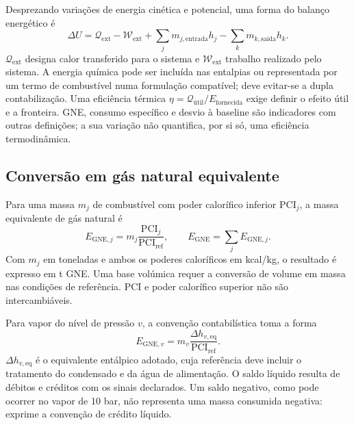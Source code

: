 Desprezando variações de energia cinética e potencial, uma forma do balanço energético é
\begin{equation}
\Delta U=\mathcal Q_{\mathrm{ext}}-\mathcal W_{\mathrm{ext}}
+\sum_j m_{j,\mathrm{entrada}}h_j-\sum_k m_{k,\mathrm{saída}}h_k.
\label{eq:mat-balanco-energia}
\end{equation}
$\mathcal Q_{\mathrm{ext}}$ designa calor transferido para o sistema e $\mathcal W_{\mathrm{ext}}$ trabalho realizado pelo sistema. A energia química pode ser incluída nas entalpias ou representada por um termo de combustível numa formulação compatível; deve evitar-se a dupla contabilização. Uma eficiência térmica $\eta=\mathcal Q_{\mathrm{útil}}/E_{\mathrm{fornecida}}$ exige definir o efeito útil e a fronteira. GNE, consumo específico e desvio à baseline são indicadores com outras definições; a sua variação não quantifica, por si só, uma eficiência termodinâmica.


\subsection{Conversão em gás natural equivalente}
\label{sec:mat-gne}
Para uma massa $m_j$ de combustível com poder calorífico inferior $\mathrm{PCI}_j$, a massa equivalente de gás natural é
\begin{equation}
E_{\mathrm{GNE},j}=m_j\frac{\mathrm{PCI}_j}{\mathrm{PCI}_{\mathrm{ref}}},
\qquad E_{\mathrm{GNE}}=\sum_j E_{\mathrm{GNE},j}.
\label{eq:mat-gne-combustivel}
\end{equation}
Com $m_j$ em toneladas e ambos os poderes caloríficos em kcal/kg, o resultado é expresso em t GNE. Uma base volúmica requer a conversão de volume em massa nas condições de referência. PCI e poder calorífico superior não são intercambiáveis.

Para vapor do nível de pressão $v$, a convenção contabilística toma a forma
\begin{equation}
E_{\mathrm{GNE},v}=m_v\frac{\Delta h_{v,\mathrm{eq}}}{\mathrm{PCI}_{\mathrm{ref}}}.
\label{eq:mat-gne-vapor}
\end{equation}
$\Delta h_{v,\mathrm{eq}}$ é o equivalente entálpico adotado, cuja referência deve incluir o tratamento do condensado e da água de alimentação. O saldo líquido resulta de débitos e créditos com os sinais declarados. Um saldo negativo, como pode ocorrer no vapor de 10 bar, não representa uma massa consumida negativa: exprime a convenção de crédito líquido.


